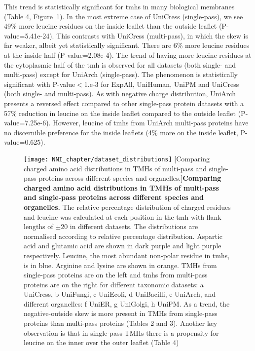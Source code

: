 This trend is statistically significant for \gls{tmh}s in many biological membranes (Table 4, Figure~\ref{fig:dataset_distributions}). In the most extreme case of UniCress (single-pass), we see 49\% more leucine residues on the inside leaflet than the outside leaflet (P-value=5.41e-24). This contrasts with UniCress (multi-pass), in which the skew is far weaker, albeit yet statistically significant. There are 6\% more leucine residues at the inside half (P-value=2.08e-4). The trend of having more leucine residues at the cytoplasmic half of the \gls{tmh} is observed for all datasets (both single- and multi-pass) except for UniArch (single-pass). The phenomenon is statistically significant with P-value$<$1.e-3 for ExpAll, UniHuman, UniPM and UniCress (both single- and multi-pass). As with negative charge distribution, UniArch presents a reversed effect compared to other single-pass protein datasets with a 57\% reduction in leucine on the inside leaflet compared to the outside leaflet (P-value=7.25e-6). However, leucine of \gls{tmh}s from UniArch multi-pass proteins have no discernible preference for the inside leaflets (4\% more on the inside leaflet, P-value=0.625).

\begin{figure}[!ht]
\centering
\texttt{[image: NNI\_chapter/dataset\_distributions]}
[Comparing charged amino acid distributions in TMHs of multi-pass and single-pass proteins across different species and organelles.]{\textbf{Comparing charged amino acid distributions in TMHs of multi-pass and single-pass proteins across different species and organelles.} The relative percentage distribution of charged residues and leucine was calculated at each position in the \gls{tmh} with flank lengths of $\pm$20 in different datasets. The distributions are normalised according to relative percentage distribution. Aspartic acid and glutamic acid are shown in dark purple and light purple respectively. Leucine, the most abundant non-polar residue in \gls{tmh}s, is in blue. Arginine and lysine are shown in orange. TMHs from single-pass proteins are on the left and \gls{tmh}s from multi-pass proteins are on the right for different taxonomic datasets: a UniCress, b UniFungi, c UniEcoli, d UniBacilli, e UniArch, and different organelles: f UniER, g UniGolgi, h UniPM. As a trend, the negative-outside skew is more present in TMHs from single-pass proteins than multi-pass proteins (Tables 2 and 3). Another key observation is that in single-pass TMHs there is a propensity for leucine on the inner over the outer leaflet (Table 4)}


\label{fig:dataset_distributions}
\end{figure}

